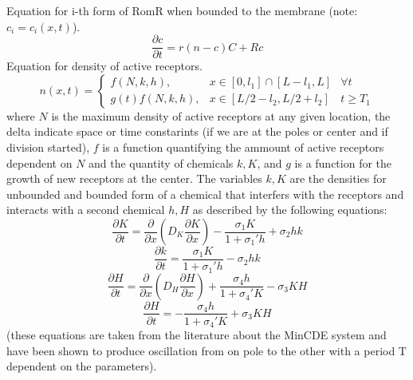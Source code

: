 \documentclass[12pt]{article}
\begin{document}
Equation for i-th form of RomR when bounded to the membrane (note:$c_i=c_i(x,t)$).
\begin{equation}
\frac{\partial c}{\partial t}=r(n-c)C+R c
\end{equation}
Equation for density of active receptors.
\begin{equation}
   n(x,t) = \left\{
     \begin{array}{lcr}
       f (N, k, h),& x\in [0, l_1]\cap [L-l_1, L] & \forall t\\
 g(t)f (N, k, h) ,& x \in[L/2-l_2, L/2 +l_2 ] & t \geq T_1

     \end{array}
   \right.
\end{equation}
where $N$ is the maximum density of active receptors at any given location, the delta indicate space or time constarints (if we are at the poles or center and if division started), $f$ is a function quantifying the ammount of active receptors dependent on $N$ and the quantity of chemicals $k, K$, and $g$ is a function for the growth of new receptors at the center.
The variables $k, K$ are the densities for unbounded and bounded form of a chemical that interfers with the receptors and interacts with a second chemical $h,H$ as described by the following equations:
\begin{equation}
\frac{\partial K}{\partial t}=\frac{\partial}{\partial x}(D_K\frac{\partial K}{\partial x})-\frac{\sigma_1K}{1+\sigma_1'h}+\sigma_2hk
\end{equation}
\begin{equation}
\frac{\partial k}{\partial t}=\frac{\sigma_1K}{1+\sigma_1'h}-\sigma_2hk
\end{equation}
\begin{equation}
\frac{\partial H}{\partial t}=\frac{\partial}{\partial x}(D_H\frac{\partial H}{\partial x})+\frac{\sigma_4h}{1+\sigma_4'K}-\sigma_3KH
\end{equation}
\begin{equation}
\frac{\partial H}{\partial t}=-\frac{\sigma_4h}{1+\sigma_4'K}+\sigma_3KH
\end{equation}
(these equations are taken from the literature about the MinCDE system and have been shown to produce oscillation from on pole to the other with a period T dependent on the parameters).
\end{document}
